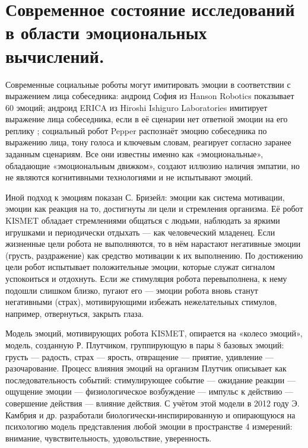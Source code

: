 \chapter{Современное состояние исследований в области эмоциональных вычислений.}
\label{chap:literature_review}
Современные социальные роботы могут имитировать эмоции в соответствии с выражением лица собеседника: андроид София из Hanson Robotics показывает 60 эмоций; андроид ERICA из Hiroshi Ishiguro Laboratories имитирует выражение лица собеседника, если в её сценарии нет ответной эмоции на его реплику \cite{erica}; социальный робот Pepper распознаёт эмоцию собеседника по выражению лица, тону голоса и ключевым словам, реагирует согласно заранее заданным сценариям.\cite{meetpepper} Все они известны именно как «эмоциональные», обладающие «эмоциональным движком», создают иллюзию наличия эмпатии, но не являются когнитивными технологиями и не испытывают эмоций.


Иной подход к эмоциям показан С. Бризейл: эмоции как система мотивации, эмоции как реакция на то, достигнуты ли цели и стремления организма.\cite{Breazeal2003} Её робот KISMET обладает стремлениями общаться с людьми, наблюдать за яркими игрушками и периодически отдыхать — как человеческий младенец. Если жизненные цели робота не выполняются, то в нём нарастают негативные эмоции (грусть, раздражение) как средство мотивации к их выполнению. По достижению цели робот испытывает положительные эмоции, которые служат сигналом успокоиться и отдохнуть. Если же стимуляция робота перевыполнена, к нему подошли слишком близко, пугают его — эмоции робота вновь станут негативными (страх), мотивирующими избежать нежелательных стимулов, например, отвернуться, закрыть глаза.


Модель эмоций, мотивирующих робота KISMET, опирается на «колесо эмоций», модель, созданную Р. Плутчиком, группирующую в пары 8 базовых эмоций: грусть — радость, страх — ярость, отвращение — приятие, удивление — разочарование. Процесс влияния эмоций на организм Плутчик описывает как последовательность событий: стимулирующее событие — ожидание реакции — ощущение эмоции — физиологическое возбуждение — импульс к действию — совершение действия — влияние действия.\cite{plutchik2001} С учётом этой модели в 2012 году Э. Камбрия и др. разработали биологически-инспирированную и опирающуюся на психологию модель представления любой эмоции в пространстве 4 измерений: внимание, чувствительность, удовольствие, уверенность.\cite{hourglass}


